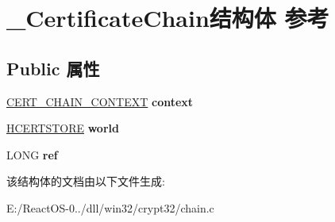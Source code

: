 \hypertarget{struct___certificate_chain}{}\section{\+\_\+\+Certificate\+Chain结构体 参考}
\label{struct___certificate_chain}
\subsection*{Public 属性}
\begin{DoxyCompactItemize}
\item 
\mbox{\label{struct___certificate_chain_ae627a4ac6aa9dece5a65524611ee2cca}} 
\hyperlink{struct___c_e_r_t___c_h_a_i_n___c_o_n_t_e_x_t}{C\+E\+R\+T\+\_\+\+C\+H\+A\+I\+N\+\_\+\+C\+O\+N\+T\+E\+XT} {\bfseries context}
\item 
\mbox{\label{struct___certificate_chain_af38b2b1bc18510abc1148214182188a7}} 
\hyperlink{interfacevoid}{H\+C\+E\+R\+T\+S\+T\+O\+RE} {\bfseries world}
\item 
\mbox{\label{struct___certificate_chain_a46c4f6eb5d28efcf692aca4dbe7134a0}} 
L\+O\+NG {\bfseries ref}
\end{DoxyCompactItemize}


该结构体的文档由以下文件生成\+:\begin{DoxyCompactItemize}
\item 
E\+:/\+React\+O\+S-\/0../dll/win32/crypt32/chain.\+c\end{DoxyCompactItemize}
